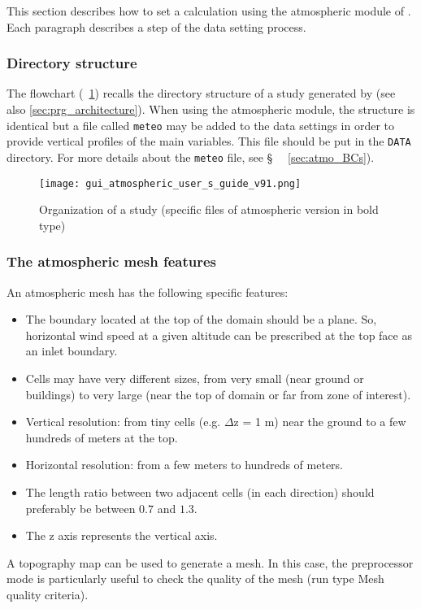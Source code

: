 {{This section describes how to set a calculation using the atmospheric module
of \CS. Each paragraph describes a step of the data setting process.

\subsubsection{Directory structure}\label{sec:atmo_struct}
%
The flowchart (\figurename~\ref{fig:organisation}) recalls the directory
structure of a study generated by \CS (see also \ref{sec:prg_architecture}).
When using the atmospheric module, the structure is identical but a file called
\texttt{meteo} may be added to the data settings in order to provide vertical
profiles of the main variables. This file should be put in the \texttt{DATA}
directory. For more details about the \texttt{meteo} file, see \S~
~\ref{sec:atmo_BCs}).
%
\begin{figure}[ht]
 \centerline{\texttt{[image: gui\_atmospheric\_user\_s\_guide\_v91.png]}}
 \caption{Organization of a study (specific files of atmospheric version in bold type)}
 \label{fig:organisation}
\end{figure}
%
\subsubsection{The atmospheric mesh features}
%
An atmospheric mesh has the following specific features:
%
\begin{itemize}
\item The boundary located at the top of the domain should be a plane.
So, horizontal wind speed at a given altitude can be prescribed at the top
face as an inlet boundary.
\item Cells may have very different sizes, from very small (near ground or
buildings) to very large (near the top of domain or far from zone of interest).
\item Vertical resolution: from tiny cells (e.g. $\Delta $\upshape z = 1 m) near
the ground to a few hundreds of meters at the top.
\item Horizontal resolution: from a few meters to hundreds of meters.
\item The length ratio between two adjacent cells (in each direction) should
preferably be between $0.7$ and $1.3$.
\item The z axis represents the vertical axis.
\end{itemize}
%
A topography map can be used to generate a mesh. In this case, the preprocessor
 mode is particularly useful to check the quality of the mesh (run type Mesh
quality criteria).
%
}}
